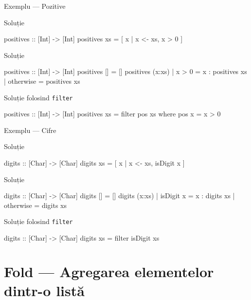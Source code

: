 \documentclass[xcolor=pdftex,romanian,colorlinks]{beamer}
\begin{document}
\begin{frame}[fragile]{Exemplu --- Pozitive}
\begin{block}{Soluție }
\vspace{-1ex}
\begin{asciihs}
positives :: [Int] -> [Int]
positives xs = [ x | x <- xs, x > 0 ]
\end{asciihs}
\end{block}
\begin{block}{Soluție }
\vspace{-1ex}
\begin{asciihs}
positives :: [Int] -> [Int]
positives []                 = []
positives (x:xs) | x > 0     = x : positives xs
                 | otherwise = positives xs
\end{asciihs}
\end{block}
\begin{block}{Soluție folosind \lstinline$filter$}
\vspace{-1ex}
\begin{asciihs}
positives :: [Int] -> [Int]
positives xs = filter pos xs
  where pos x = x > 0
\end{asciihs}
\end{block}
\end{frame}


\begin{frame}[fragile]{Exemplu --- Cifre}
\begin{block}{Soluție }
\begin{asciihs}
digits :: [Char] -> [Char]
digits xs = [ x | x <- xs, isDigit x ]
\end{asciihs}
\end{block}
\begin{block}{Soluție }
\begin{asciihs}
digits :: [Char] -> [Char]
digits []                 = []
digits (x:xs) | isDigit x = x : digits xs
              | otherwise = digits xs
\end{asciihs}
\end{block}
\begin{block}{Soluție folosind \lstinline$filter$}
\begin{asciihs}
digits :: [Char] -> [Char]
digits xs = filter isDigit xs
\end{asciihs}
\end{block}
\end{frame}

\section{Fold --- Agregarea elementelor dintr-o listă}
\end{document}
